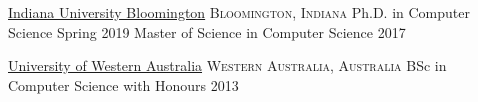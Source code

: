 \documentclass[10pt,a4paper]{article}
\begin{document}

\headedsection
  {\href{http://www.indiana.edu}{Indiana University Bloomington}}
  {\textsc{Bloomington, Indiana}} {%
  \headedsubsection
    {Ph.D. in Computer Science 
    }
    {%
    Spring 2019 %
    }
    {}
  \headedsubsection
    {Master of Science in Computer Science}
    {%
    2017}
    {}
}

\headedsection
  {\href{http://www.uwa.edu.au}{University of Western Australia}}
  {\textsc{Western Australia, Australia}} {%
  \headedsubsection
    {BSc in Computer Science with Honours}
    {%
    2013}
    {}
}

%
%
%

%
%


%

\end{document}
